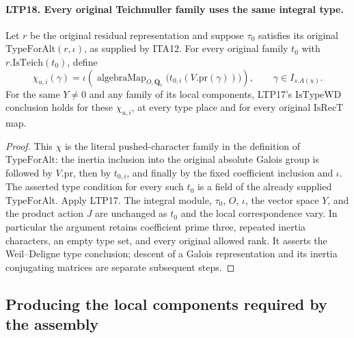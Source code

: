 \documentclass[11pt,a4paper]{article}
\numberwithin{equation}{section}
\theoremstyle{remark}\newtheorem{remark}[theorem]{Remark}
\begin{document}
\paragraph{LTP18. Every original Teichmuller family uses the same integral type.}
\label{claim:LTP18}
Let \(r\) be the original residual representation and suppose
\(\tau_0\) satisfies its original \(\mathrm{TypeForAlt}(r,\iota)\),
as supplied by ITA12.  For every original family \(t_0\) with
\(r.\mathrm{IsTeich}(t_0)\), define
\[
 \chi_{u,i}(\gamma)
       =\iota\!\left(\operatorname{algebraMap}_{O,\overline{\mathbf Q}_\ell}
                      \bigl(t_{0,i}(V.\mathrm{pr}(\gamma))\bigr)\right),
                         \qquad\gamma\in I_{s.A(u)} .
\]
For the same \(Y\ne0\) and any family of its local components,
LTP17's \(\mathrm{IsTypeWD}\) conclusion holds for these
\(\chi_{u,i}\), at every type place and for every original
\(\mathrm{IsRecT}\) map.
\begin{proof}
This \(\chi\) is the literal pushed-character family in the
definition of \(\mathrm{TypeForAlt}\): the inertia inclusion
into the original absolute Galois group is followed by
\(V.\mathrm{pr}\), then by \(t_{0,i}\), and finally by the
fixed coefficient inclusion and \(\iota\).
The asserted type condition for every such \(t_0\) is a field
of the already supplied \(\mathrm{TypeForAlt}\).
Apply LTP17.  The integral module, \(\tau_0\), \(O\), \(\iota\),
the vector space \(Y\), and the product action \(J\) are unchanged
as \(t_0\) and the local correspondence vary.
In particular the argument retains coefficient prime three,
repeated inertia characters, an empty type set, and every
original allowed rank.  It asserts the Weil--Deligne type
conclusion; descent of a Galois representation and its inertia
conjugating matrices are separate subsequent steps.
\end{proof}

\subsection{Producing the local components required by the assembly}

\end{document}
